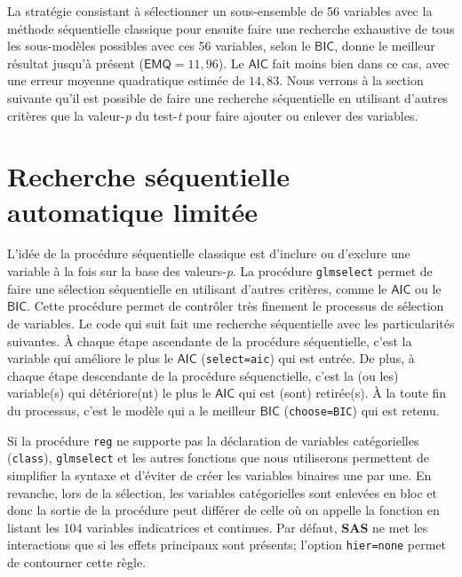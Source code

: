 \documentclass[
  11pt,
  letterpaper,
]{book}
\theoremstyle{definition}
\theoremstyle{definition}
\theoremstyle{definition}
\theoremstyle{remark}
\begin{document}
La stratégie consistant à sélectionner un sous-ensemble de 56 variables avec la méthode séquentielle classique pour ensuite faire une recherche exhaustive de tous les sous-modèles possibles avec ces 56 variables, selon le \(\mathsf{BIC}\), donne le meilleur résultat jusqu'à présent (\(\mathsf{EMQ}=11,96\)). Le \(\mathsf{AIC}\) fait moins bien dans ce cas, avec une erreur moyenne quadratique estimée de \(14,83\). Nous verrons à la section suivante qu'il est possible de faire une recherche séquentielle en utilisant d'autres critères que la valeur-\emph{p} du test-\emph{t} pour faire ajouter ou enlever des variables.

\hypertarget{recherche-suxe9quentielle-automatique-limituxe9e}{%
\section{Recherche séquentielle automatique limitée}\label{recherche-suxe9quentielle-automatique-limituxe9e}}

L'idée de la procédure séquentielle classique est d'inclure ou d'exclure une variable à la fois sur la base des valeurs-\emph{p}. La procédure \texttt{glmselect} permet de faire une sélection séquentielle en utilisant d'autres critères, comme le \(\mathsf{AIC}\) ou le \(\mathsf{BIC}\). Cette procédure permet de contrôler très finement le processus de sélection de variables. Le code qui suit fait une recherche séquentielle avec les particularités suivantes. À chaque étape ascendante de la procédure séquentielle, c'est la variable qui améliore le plus le \(\mathsf{AIC}\) (\texttt{select=aic}) qui est entrée. De plus, à chaque étape descendante de la procédure séquenctielle, c'est la (ou les) variable(s) qui détériore(nt) le plus le \(\mathsf{AIC}\) qui est (sont) retirée(s). À la toute fin du processus, c'est le modèle qui a le meilleur \(\mathsf{BIC}\) (\texttt{choose=BIC}) qui est retenu.

Si la procédure \texttt{reg} ne supporte pas la déclaration de variables catégorielles (\texttt{class}), \texttt{glmselect} et les autres fonctions que nous utiliserons permettent de simplifier la syntaxe et d'éviter de créer les variables binaires une par une. En revanche, lors de la sélection, les variables catégorielles sont enlevées en bloc et donc la sortie de la procédure peut différer de celle où on appelle la fonction en listant les 104 variables indicatrices et continues. Par défaut, \textbf{SAS} ne met les interactions que si les effets principaux sont présents; l'option \texttt{hier=none} permet de contourner cette règle.
\end{document}
